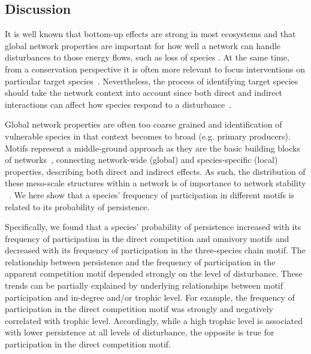 \documentclass[12pt]{article}
\begin{document}
\begin{spacing}{2.0}
\section*{Discussion}




It is well known that bottom-up effects are strong in most ecosystems and that global network properties are important for how well a network can handle disturbances to those energy flows, such as loss of species \citep{Dunne2002, Eklof2006, PascualDunne2006}. 
At the same time, from a conservation perspective it is often more relevant to focus interventions on particular target species~\citep{Bottrilletal2008}. 
Nevertheless, the process of identifying target species should take the network context into account since both direct and indirect interactions can affect how species respond to a disturbance~\citep{curtsdotter2011robustness, dunne2009cascading, Eklof2006}. 


Global network properties are often too coarse grained and identification of vulnerable species in that context becomes to broad (e.g. primary producers). Motifs represent a middle-ground approach as they are the basic building blocks of networks~\citep{Milo2002}, connecting network-wide (global) and species-specific (local) properties, describing both direct and indirect effects. 
As such, the distribution of these meso-scale structures within a network is of importance to network stability ~\citep{prill2005dynamic, bascompte2005simple}.
We here show that a species' frequency of participation in different motifs is related to its probability of persistence.


Specifically, we found that a species' probability of persistence increased with its frequency of participation in the direct competition and omnivory motifs and decreased with its frequency of participation in the three-species chain motif.
The relationship between persistence and the frequency of participation in the apparent competition motif depended strongly on the level of disturbance.
These trends can be partially explained by underlying relationships between motif participation and in-degree and/or trophic level.
For example, the frequency of participation in the direct competition motif was strongly and negatively correlated with trophic level.
Accordingly, while a high trophic level is associated with lower persistence at all levels of disturbance, the opposite is true for participation in the direct competition motif.



\end{spacing}
\end{document}
